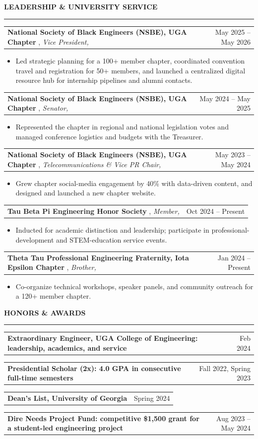 \documentclass[letterpaper,10pt]{article}
\makeatletter
\newcommand{\SectionGapBefore}{12pt}
\newcommand{\SectionGapAfter}{4pt}
\newcommand{\EntryGapAfter}{2pt}
\newcommand{\IfEmpty}[3]{\if\relax\detokenize{#1}\relax#2\else#3\fi}
\newcommand{\sectiontitle}[1]{%
  \Needspace*{5\baselineskip}%
  \vspace{\SectionGapBefore}%
  {\textbf{\large #1}}\par
  \vspace{-6pt}%
  \rule{\textwidth}{0.4pt}\par
  \vspace{\SectionGapAfter}%
}
\newcommand{\experienceheading}[4]{%
  \Needspace*{3\baselineskip}%
  \begin{tabularx}{\textwidth}{@{}X r@{}}%
    \textbf{#1}%
    \IfEmpty{#2}{}{, \textit{#2\IfEmpty{#3}{}{,}}}%
    \IfEmpty{#3}{}{ #3}%
    & #4 \\%
  \end{tabularx}\par
  \nopagebreak\vspace{\EntryGapAfter}%
}
\newcommand{\awardrow}[2]{%
  \Needspace*{3\baselineskip}%
  \begin{tabularx}{\textwidth}{@{}X r@{}}
    \textbf{#1} & #2 \\
  \end{tabularx}\par
  \vspace{1pt}%
}
\makeatother
\begin{document}
\sectiontitle{LEADERSHIP \& UNIVERSITY SERVICE}
\experienceheading{National Society of Black Engineers (NSBE), UGA Chapter}{Vice President}{}{May 2025 -- May 2026}
\begin{itemize}
\item Led strategic planning for a 100+ member chapter, coordinated convention travel and registration for 50+ members, and launched a centralized digital resource hub for internship pipelines and alumni contacts.
\end{itemize}
\experienceheading{National Society of Black Engineers (NSBE), UGA Chapter}{Senator}{}{May 2024 -- May 2025}
\begin{itemize}
\item Represented the chapter in regional and national legislation votes and managed conference logistics and budgets with the Treasurer.
\end{itemize}
\experienceheading{National Society of Black Engineers (NSBE), UGA Chapter}{Telecommunications \& Vice PR Chair}{}{May 2023 -- May 2024}
\begin{itemize}
\item Grew chapter social-media engagement by 40\% with data-driven content, and designed and launched a new chapter website.
\end{itemize}
\experienceheading{Tau Beta Pi Engineering Honor Society}{Member}{}{Oct 2024 -- Present}
\begin{itemize}
\item Inducted for academic distinction and leadership; participate in professional-development and STEM-education service events.
\end{itemize}
\experienceheading{Theta Tau Professional Engineering Fraternity, Iota Epsilon Chapter}{Brother}{}{Jan 2024 -- Present}
\begin{itemize}
\item Co-organize technical workshops, speaker panels, and community outreach for a 120+ member chapter.
\end{itemize}


\sectiontitle{HONORS \& AWARDS}
\awardrow{Extraordinary Engineer, UGA College of Engineering{\normalfont : leadership, academics, and service}}{Feb 2024}
\awardrow{Presidential Scholar (2x){\normalfont : 4.0 GPA in consecutive full-time semesters}}{Fall 2022, Spring 2023}
\awardrow{Dean's List, University of Georgia}{Spring 2024}
\awardrow{Dire Needs Project Fund{\normalfont : competitive \$1,500 grant for a student-led engineering project}}{Aug 2023 -- May 2024}
\end{document}
